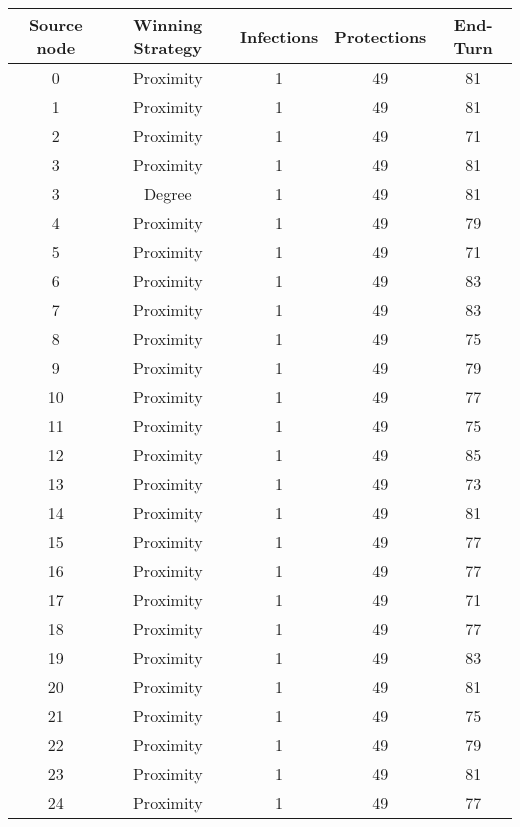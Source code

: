 \documentclass[results.tex]{subfiles}
\begin{document}
\begin{center}
  \begin{tabular}{| c || c | c | c | c |}
    \hline
    {\bfseries Source node} & {\bfseries Winning Strategy} & {\bfseries Infections} & {\bfseries Protections} & {\bfseries End-Turn} \\  %
    \hline\hline
    0 & Proximity & 1 & 49 & 81 \\ 
    \hline
    1 & Proximity & 1 & 49 & 81 \\ 
    \hline
    2 & Proximity & 1 & 49 & 71 \\ 
    \hline
    3 & Proximity & 1 & 49 & 81 \\ 
    \hline
    3 & Degree & 1 & 49 & 81 \\ 
    \hline
    4 & Proximity & 1 & 49 & 79 \\ 
    \hline
    5 & Proximity & 1 & 49 & 71 \\ 
    \hline
    6 & Proximity & 1 & 49 & 83 \\ 
    \hline
    7 & Proximity & 1 & 49 & 83 \\ 
    \hline
    8 & Proximity & 1 & 49 & 75 \\ 
    \hline
    9 & Proximity & 1 & 49 & 79 \\ 
    \hline
    10 & Proximity & 1 & 49 & 77 \\ 
    \hline
    11 & Proximity & 1 & 49 & 75 \\ 
    \hline
    12 & Proximity & 1 & 49 & 85 \\ 
    \hline
    13 & Proximity & 1 & 49 & 73 \\ 
    \hline
    14 & Proximity & 1 & 49 & 81 \\ 
    \hline
    15 & Proximity & 1 & 49 & 77 \\ 
    \hline
    16 & Proximity & 1 & 49 & 77 \\ 
    \hline
    17 & Proximity & 1 & 49 & 71 \\ 
    \hline
    18 & Proximity & 1 & 49 & 77 \\ 
    \hline
    19 & Proximity & 1 & 49 & 83 \\ 
    \hline
    20 & Proximity & 1 & 49 & 81 \\ 
    \hline
    21 & Proximity & 1 & 49 & 75 \\ 
    \hline
    22 & Proximity & 1 & 49 & 79 \\ 
    \hline
    23 & Proximity & 1 & 49 & 81 \\ 
    \hline
    24 & Proximity & 1 & 49 & 77 \\ 

\end{tabular}
\end{center}
\end{document}
